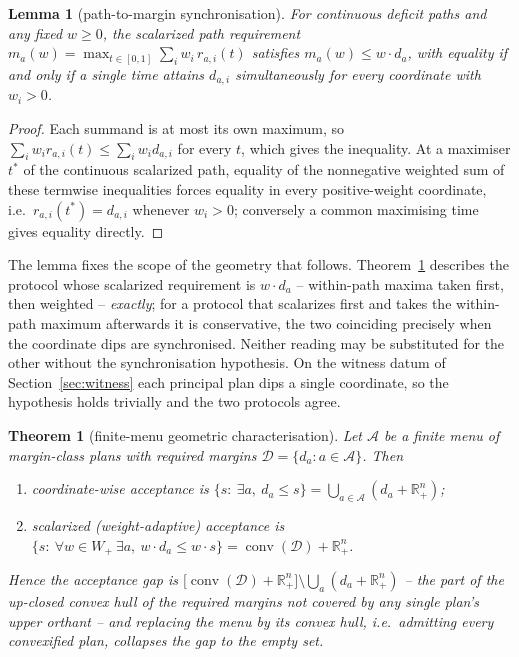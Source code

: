 \documentclass[preprint,11pt,authoryear]{elsarticle}
\newtheorem{theorem}{Theorem}
\newtheorem{lemma}{Lemma}
\theoremstyle{definition}
\theoremstyle{remark}
\newcommand{\Wp}{W_+}
\newcommand{\conv}{\operatorname{conv}}
\newcommand{\Rp}{\mathbb{R}^n_+}
\begin{document}
\begin{lemma}[path-to-margin synchronisation]\label{lem:sync}
For continuous deficit paths and any fixed $w\ge0$, the scalarized path requirement $m_a(w)=\max_{t\in[0,1]}\sum_iw_i\,r_{a,i}(t)$ satisfies $m_a(w)\le w\cdot d_a$, with equality if and only if a single time attains $d_{a,i}$ simultaneously for every coordinate with $w_i>0$.
\end{lemma}
\begin{proof}
Each summand is at most its own maximum, so $\sum_iw_ir_{a,i}(t)\le\sum_iw_id_{a,i}$ for every $t$, which gives the inequality. At a maximiser $t^\ast$ of the continuous scalarized path, equality of the nonnegative weighted sum of these termwise inequalities forces equality in every positive-weight coordinate, i.e.\ $r_{a,i}(t^\ast)=d_{a,i}$ whenever $w_i>0$; conversely a common maximising time gives equality directly.
\end{proof}

The lemma fixes the scope of the geometry that follows. Theorem~\ref{thm:menu} describes the protocol whose scalarized requirement is $w\cdot d_a$ -- within-path maxima taken first, then weighted -- \emph{exactly}; for a protocol that scalarizes first and takes the within-path maximum afterwards it is conservative, the two coinciding precisely when the coordinate dips are synchronised. Neither reading may be substituted for the other without the synchronisation hypothesis. On the witness datum of Section~\ref{sec:witness} each principal plan dips a single coordinate, so the hypothesis holds trivially and the two protocols agree.

\begin{theorem}[finite-menu geometric characterisation]\label{thm:menu}
Let $\mathcal A$ be a finite menu of margin-class plans with required margins $\mathcal D=\{d_a:a\in\mathcal A\}$. Then
\begin{enumerate}[label=\textup{(\roman*)},leftmargin=2em]
\item coordinate-wise acceptance is $\{s:\ \exists a,\ d_a\le s\}=\bigcup_{a\in\mathcal A}(d_a+\Rp)$;
\item scalarized (weight-adaptive) acceptance is $\{s:\ \forall w\in\Wp\ \exists a,\ w\cdot d_a\le w\cdot s\}=\conv(\mathcal D)+\Rp$.
\end{enumerate}
Hence the acceptance gap is $\big[\conv(\mathcal D)+\Rp\big]\setminus\bigcup_{a}(d_a+\Rp)$ -- the part of the up-closed convex hull of the required margins not covered by any single plan's upper orthant -- and replacing the menu by its convex hull, i.e.\ admitting every convexified plan, collapses the gap to the empty set.
\end{theorem}
\end{document}
